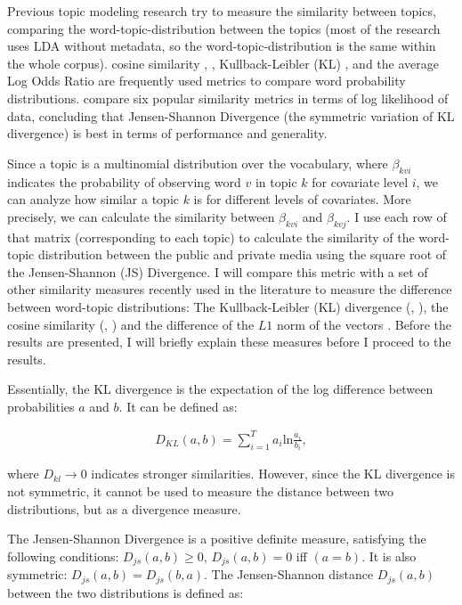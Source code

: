 \documentclass[12pt,a4paper,notitlepage]{article}
\begin{document}
Previous topic modeling research try to measure the similarity between topics, comparing the word-topic-distribution between the topics (most of the research uses LDA without metadata, so the word-topic-distribution is the same within the whole corpus). cosine similarity \citep{he_detecting_2009}, \citep{ramage_labeled_2009}, Kullback-Leibler (KL) \citep{newman_distributed_2009}, \citep{wang_mining_2009} and the average Log Odds Ratio \citep{chaney_visualizing_2012} are frequently used metrics to compare word probability distributions. \citet{kim_topic_2011} compare six popular similarity metrics in terms of log likelihood of data, concluding that Jensen-Shannon Divergence (the symmetric variation of KL divergence) is best in terms of performance and generality. 

Since a topic is a multinomial distribution over the vocabulary, where $\beta_{kvi}$ indicates the probability of observing word $v$ in topic $k$ for covariate level $i$, we can analyze how similar a topic $k$ is for different levels of covariates. More precisely, we can calculate the similarity between $\beta_{kvi}$ and $\beta_{kvj}$. I use each row of that matrix (corresponding to each topic) to calculate the similarity of the word-topic distribution between the public and private media using the square root of the Jensen-Shannon (JS) Divergence. I will compare this metric with a set of other similarity measures recently used in the literature to measure the difference between word-topic distributions: The Kullback-Leibler (KL) divergence (\citet{newman_distributed_2009}, \citet{wang_mining_2009}), the cosine similarity (\citet{he_detecting_2009}, \citet{ramage_labeled_2009}) and the difference of the $L1$ norm of the vectors \citep{roberts_navigating_2016}. Before the results are presented, I will briefly explain these measures before I proceed to the results.

Essentially, the KL divergence is the expectation of the log difference between probabilities $a$ and $b$. It can be defined as:

\begin{align*}
	D_{KL}(a,b)=\sum_{i=1}^T a_i \text{ln} \frac{a_i}{b_i},
\end{align*}

where $D_{kl} \to 0$ indicates stronger similarities. However, since the KL divergence is not symmetric, it cannot be used to measure the distance between two distributions, but as a divergence measure.

The Jensen-Shannon Divergence is a positive definite measure, satisfying the following conditions: $D_{js}(a,b) \geq 0$, $D_{js}(a,b)=0$ iff $(a=b)$. It is also symmetric: $D_{js}(a,b)=D_{js}(b,a)$. The Jensen-Shannon distance $D_{js}(a,b)$ between the two distributions is defined as:
\end{document}

